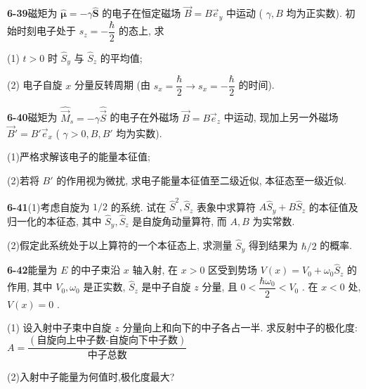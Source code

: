 \newpage

\textbf{6-39}\quad 磁矩为 $\displaystyle \hat{\pmb{\mu}} = -\gamma \hat{\pmb{S}}$ 的电子在恒定磁场 $\displaystyle \vec{B} = B\vec{e}_{y}$ 中运动 ( $\displaystyle \gamma, B$ 均为正实数). 初始时刻电子处于 $\displaystyle s_z = -\dfrac{\hbar}{2}$ 的态上, 求

(1) $\displaystyle t > 0$ 时 $\displaystyle \hat{S}_y$ 与 $\displaystyle \hat{S}_z$ 的平均值;

(2) 电子自旋 $\displaystyle x$ 分量反转周期 (由 $\displaystyle s_x = \dfrac{\hbar}{2} \to s_x = -\dfrac{\hbar}{2}$ 的时间).

\vfill

\newpage

\textbf{6-40}\quad 磁矩为 $\displaystyle \hat{\vec{M}}_s = -\gamma \hat{\vec{S}}$ 的电子在外磁场 $\displaystyle \vec{B} = B\vec{e}_{z}$ 中运动, 现加上另一外磁场 $\displaystyle \vec{B}' = B'\vec{e}_{x}$ ( $\displaystyle \gamma > 0, B, B'$ 均为实数).

(1)严格求解该电子的能量本征值;

(2)若将 $\displaystyle B'$ 的作用视为微扰, 求电子能量本征值至二级近似, 本征态至一级近似.

\vfill

\newpage

\textbf{6-41}\quad (1)考虑自旋为 $\displaystyle 1 / 2$ 的系统. 试在 $\displaystyle \hat{S}^2, \hat{S}_z$ 表象中求算符 $\displaystyle A\hat{S}_y + B\hat{S}_z$ 的本征值及归一化的本征态, 其中 $\displaystyle \hat{S}_y, \hat{S}_z$ 是自旋角动量算符, 而 $\displaystyle A, B$ 为实常数.

(2)假定此系统处于以上算符的一个本征态上, 求测量 $\displaystyle \hat{S}_y$ 得到结果为 $\displaystyle \hbar / 2$ 的概率.

\vfill

\newpage

\textbf{6-42}\quad 能量为 $\displaystyle E$ 的中子束沿 $\displaystyle x$ 轴入射, 在 $\displaystyle x > 0$ 区受到势场 $\displaystyle V(x) = V_0 + \omega_0\hat{S}_z$ 的作用, 其中 $\displaystyle V_0, \omega_0$ 是正实数, $\displaystyle \hat{S}_z$ 是中子自旋 $\displaystyle z$ 分量, 且 $\displaystyle 0 < \dfrac{\hbar \omega_0}{2} < V_0$ . 在 $\displaystyle x < 0$ 处, $\displaystyle V(x) = 0$ .

(1) 设入射中子束中自旋 $\displaystyle z$ 分量向上和向下的中子各占一半. 求反射中子的极化度:$\displaystyle A=\dfrac{(\text{自旋向上中子数-自旋向下中子数})}{\text{中子总数}}$

(2)入射中子能量为何值时,极化度最大?

